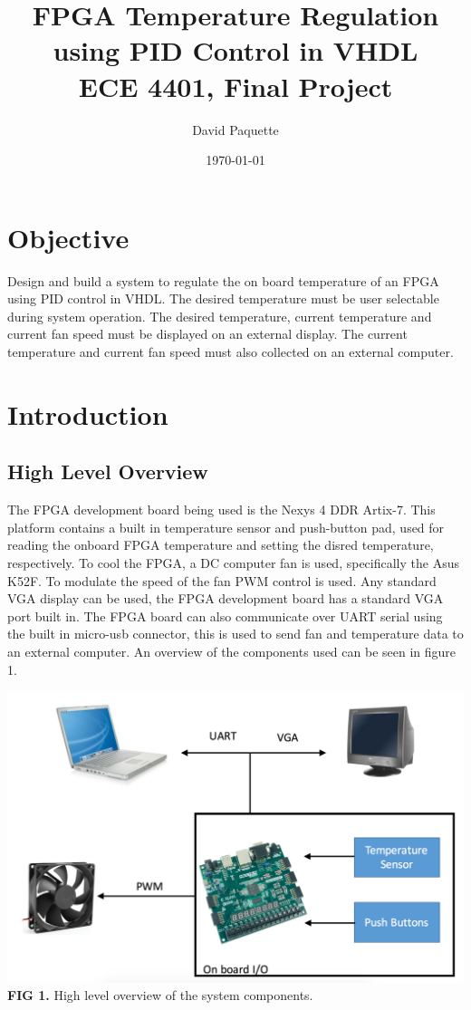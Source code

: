 \documentclass{article}
\title{\textbf{FPGA Temperature Regulation using PID Control in VHDL \\ ECE 4401, Final Project}}
\author{David Paquette}
\date{\today}
\begin{document}
\maketitle

\tableofcontents{}
\newpage
\section{Objective}
Design and build a system to regulate the on board temperature of an FPGA using PID control in VHDL. The desired temperature must be user selectable during system operation. The desired temperature, current temperature and current fan speed must be displayed on an external display. The current temperature and current fan speed must also collected on an external computer.

\section{Introduction}
\subsection{High Level Overview}
The FPGA development board being used is the Nexys 4 DDR Artix-7. This platform contains a built in temperature sensor and push-button pad, used for reading the onboard FPGA temperature and setting the disred temperature, respectively. To cool the FPGA, a DC computer fan is used, specifically the Asus K52F. To modulate the speed of the fan PWM control is used. Any standard VGA display can be used, the FPGA development board has a standard VGA port built in. The FPGA board can also communicate over UART serial using the built in micro-usb connector, this is used to send fan and temperature data to an external computer. An overview of the components used can be seen in figure 1.
\begin{center}
\includegraphics[scale=.4]{images/Overview}\\
\textbf{FIG 1.} High level overview of the system components.\\
\end{center}
\end{document}
